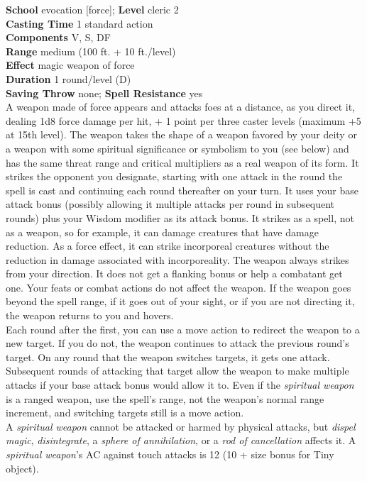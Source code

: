 \textbf{School} evocation [force]; \textbf{Level} cleric 2\\
\textbf{Casting Time} 1 standard action\\
\textbf{Components} V, S, DF\\
\textbf{Range }medium (100 ft. + 10 ft./level)\\
\textbf{Effect }magic weapon of force\\
\textbf{Duration} 1 round/level (D)\\
\textbf{Saving Throw} none; \textbf{Spell Resistance} yes\\
A weapon made of force appears and attacks foes at a distance, as you direct it, dealing 1d8 force damage per hit, + 1 point per three caster levels (maximum +5 at 15th level). The weapon takes the shape of a weapon favored by your deity or a weapon with some spiritual significance or symbolism to you (see below) and has the same threat range and critical multipliers as a real weapon of its form. It strikes the opponent you designate, starting with one attack in the round the spell is cast and continuing each round thereafter on your turn. It uses your base attack bonus (possibly allowing it multiple attacks per round in subsequent rounds) plus your Wisdom modifier as its attack bonus. It strikes as a spell, not as a weapon, so for example, it can damage creatures that have damage reduction. As a force effect, it can strike incorporeal creatures without the reduction in damage associated with incorporeality. The weapon always strikes from your direction. It does not get a flanking bonus or help a combatant get one. Your feats or combat actions do not affect the weapon. If the weapon goes beyond the spell range, if it goes out of your sight, or if you are not directing it, the weapon returns to you and hovers.\\
Each round after the first, you can use a move action to redirect the weapon to a new target. If you do not, the weapon continues to attack the previous round's target. On any round that the weapon switches targets, it gets one attack. Subsequent rounds of attacking that target allow the weapon to make multiple attacks if your base attack bonus would allow it to. Even if the \textit{spiritual weapon }is a ranged weapon, use the spell's range, not the weapon's normal range increment, and switching targets still is a move action.\\
A \textit{spiritual weapon }cannot be attacked or harmed by physical attacks, but \textit{dispel magic}, \textit{disintegrate}, a \textit{sphere of annihilation}, or a \textit{rod of cancellation }affects it. A \textit{spiritual weapon}'s AC against touch attacks is 12 (10 + size bonus for Tiny object).\\
